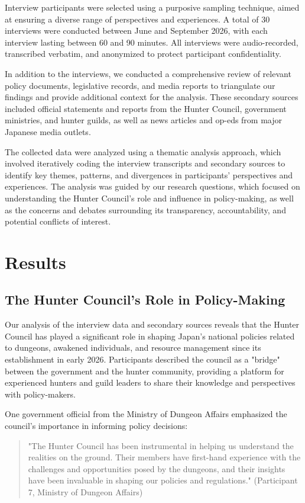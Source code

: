 \documentclass[12pt, a4paper]{article}
\begin{document}
Interview participants were selected using a purposive sampling technique, aimed at ensuring a diverse range of perspectives and experiences. A total of 30 interviews were conducted between June and September 2026, with each interview lasting between 60 and 90 minutes. All interviews were audio-recorded, transcribed verbatim, and anonymized to protect participant confidentiality.

In addition to the interviews, we conducted a comprehensive review of relevant policy documents, legislative records, and media reports to triangulate our findings and provide additional context for the analysis. These secondary sources included official statements and reports from the Hunter Council, government ministries, and hunter guilds, as well as news articles and op-eds from major Japanese media outlets.

The collected data were analyzed using a thematic analysis approach, which involved iteratively coding the interview transcripts and secondary sources to identify key themes, patterns, and divergences in participants' perspectives and experiences. The analysis was guided by our research questions, which focused on understanding the Hunter Council's role and influence in policy-making, as well as the concerns and debates surrounding its transparency, accountability, and potential conflicts of interest.

\section{Results}
\subsection{The Hunter Council's Role in Policy-Making}
Our analysis of the interview data and secondary sources reveals that the Hunter Council has played a significant role in shaping Japan's national policies related to dungeons, awakened individuals, and resource management since its establishment in early 2026. Participants described the council as a "bridge" between the government and the hunter community, providing a platform for experienced hunters and guild leaders to share their knowledge and perspectives with policy-makers.

One government official from the Ministry of Dungeon Affairs emphasized the council's importance in informing policy decisions:

\begin{quote}
    "The Hunter Council has been instrumental in helping us understand the realities on the ground. Their members have first-hand experience with the challenges and opportunities posed by the dungeons, and their insights have been invaluable in shaping our policies and regulations." (Participant 7, Ministry of Dungeon Affairs)
\end{quote}
\end{document}

